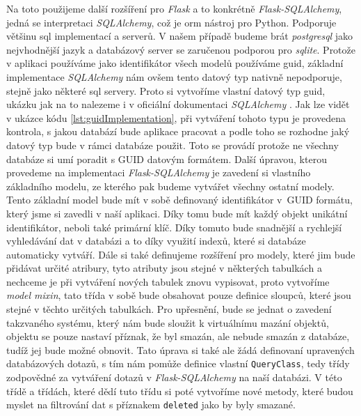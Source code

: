 Na toto použijeme další rozšíření pro \textit{Flask} a to konkrétně \textit{Flask-SQLAlchemy}, jedná se interpretaci \textit{SQLAlchemy}, což je \gls{orm} nástroj pro Python.
Podporuje většinu \gls{sql} implementací a serverů. V našem případě budeme brát \textit{postgresql} jako nejvhodnější jazyk a databázový server se zaručenou podporou pro \textit{sqlite}. Protože
v aplikaci používáme jako identifikátor všech modelů používáme \gls{guid}, základní implementace \textit{SQLAlchemy} nám ovšem tento datový typ nativně nepodporuje, stejně jako
některé \gls{sql} servery. Proto si vytvoříme vlastní datový typ \gls{guid}, ukázku jak na to nalezeme i v oficiální dokumentaci \textit{SQLAlchemy} \cite{sqlalchemyGuid}. Jak lze
vidět v ukázce kódu \ref{lst:guidImplementation}, při vytváření tohoto typu je provedena kontrola, s jakou databází bude aplikace pracovat a podle toho se rozhodne jaký datový typ
bude v rámci databáze použit. Toto se provádí protože ne všechny databáze si umí poradit s GUID datovým formátem. Další úpravou, kterou provedeme na implementaci
\textit{Flask-SQLAlchemy} je zavedení si vlastního základního modelu, ze kterého pak budeme vytvářet všechny ostatní modely. Tento základní model bude mít
v sobě definovaný identifikátor v~GUID formátu, který jsme si zavedli v naší aplikaci. Díky tomu bude mít každý objekt unikátní identifikátor, neboli také primární
klíč. Díky tomuto bude snadnější a rychlejší vyhledávání dat v databázi a to díky využití indexů, které si databáze automaticky vytváří. Dále si také definujeme
rozšíření pro modely, které jim bude přidávat určité atribury, tyto atributy jsou stejné v některých tabulkách a nechceme je při vytváření nových tabulek znovu
vypisovat, proto vytvoříme \textit{model mixin}, tato třída v sobě bude obsahovat pouze definice sloupců, které jsou stejné v těchto určitých tabulkách. Pro upřesnění,
bude se jednat o zavedení takzvaného  systému, který nám bude sloužit k virtuálnímu mazání objektů, objektu se pouze nastaví příznak, že byl smazán, ale nebude
smazán z databáze, tudíž jej bude možné obnovit. Tato úprava si také ale žádá definovaní upravených databázových dotazů, s tím nám pomůže definice vlastní
\texttt{QueryClass}, tedy třídy zodpovědné za vytváření dotazů v \textit{Flask-SQLAlchemy} na naší databázi. V této třídě a třídách, které dědí tuto třídu
si poté vytvoříme nové metody, které budou myslet na filtrování dat s příznakem \texttt{deleted} jako by byly smazané.

